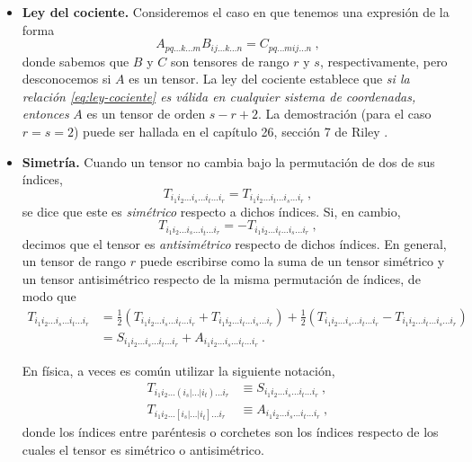 \begin{itemize}
    \item \textbf{Ley del cociente.} Consideremos el caso en que tenemos una expresión de la forma
    \begin{equation}\label{eq:ley-cociente}
        A_{pq \dots k \dots m} B_{ij \dots k \dots n} = C_{pq \dots m ij \dots n} \ ,
    \end{equation}
    donde sabemos que $B$ y $C$ son tensores de rango $r$ y $s$, respectivamente, pero desconocemos si $A$ es un tensor. La ley del cociente establece que \emph{si la relación \eqref{eq:ley-cociente} es válida en cualquier sistema de coordenadas, entonces} $A$ es un tensor de orden $s-r+2$. La demostración (para el caso $r=s=2$) puede ser hallada en el capítulo 26, sección 7 de Riley \cite{Riley}.
    
    \item \textbf{Simetría.} Cuando un tensor no cambia bajo la permutación de dos de sus índices, 
    \begin{equation}
        T_{i_1 i_2 \dots i_s \dots i_t \dots i_r} = T_{i_1 i_2 \dots i_t \dots i_s \dots i_r} \ , 
    \end{equation}
    se dice que este es \emph{simétrico} respecto a dichos índices. Si, en cambio,
    \begin{equation}
        T_{i_1 i_2 \dots i_s \dots i_t \dots i_r} = - T_{i_1 i_2 \dots i_t \dots i_s \dots i_r} \ ,
    \end{equation}
    decimos que el tensor es \emph{antisimétrico} respecto de dichos índices. En general, un tensor de rango $r$ puede escribirse como la suma de un tensor simétrico y un tensor antisimétrico respecto de la misma permutación de índices, de modo que
    \begin{align}
        T_{i_1 i_2 \dots i_s \dots i_t \dots i_r} & = \frac{1}{2} (T_{i_1 i_2 \dots i_s \dots i_t \dots i_r} + T_{i_1 i_2 \dots i_t \dots i_s \dots i_r}) + \frac{1}{2}(T_{i_1 i_2 \dots i_s \dots i_t \dots i_r} - T_{i_1 i_2 \dots i_t \dots i_s \dots i_r}) \\
        & = S_{i_1 i_2 \dots i_s \dots i_t \dots i_r} + A_{i_1 i_2 \dots i_s \dots i_t \dots i_r} \ .
    \end{align}

    En física, a veces es común utilizar la siguiente notación,
    \begin{align}
        T_{i_1 i_2 \dots (i_s| \dots |i_t) \dots i_r} & \equiv S_{i_1 i_2 \dots i_s \dots i_t \dots i_r} \ , \\
        T_{i_1 i_2 \dots [i_s| \dots |i_t] \dots i_r} & \equiv A_{i_1 i_2 \dots i_s \dots i_t \dots i_r} \ ,
    \end{align}
    donde los índices entre paréntesis o corchetes son los índices respecto de los cuales el tensor es simétrico o antisimétrico.


\end{itemize}
